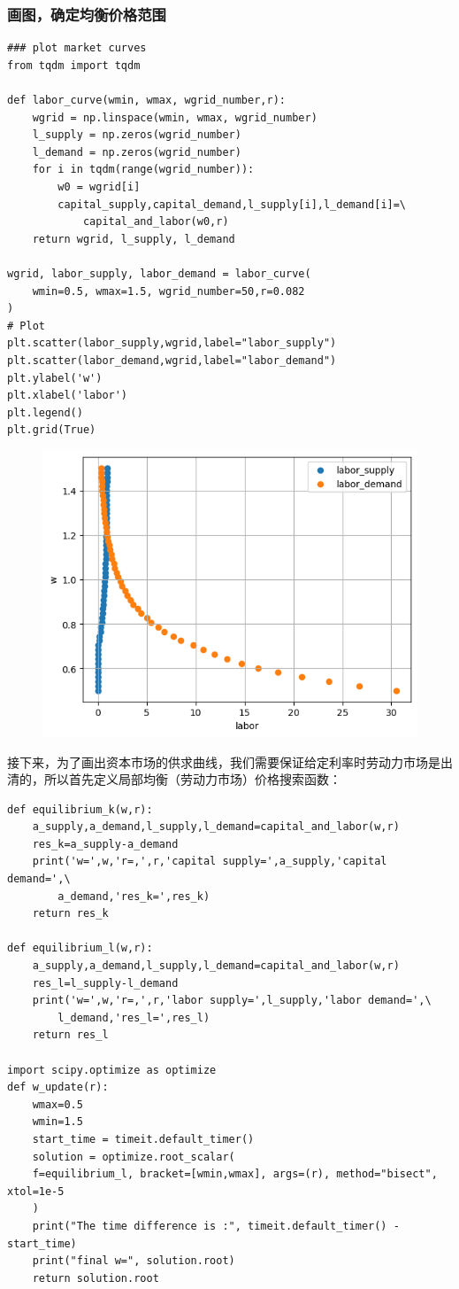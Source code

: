 \documentclass[a4paper, 12pt]{ctexart}
\begin{document}
\subsubsection{画图，确定均衡价格范围}
\begin{lstlisting}
### plot market curves
from tqdm import tqdm

def labor_curve(wmin, wmax, wgrid_number,r):
    wgrid = np.linspace(wmin, wmax, wgrid_number)
    l_supply = np.zeros(wgrid_number)
    l_demand = np.zeros(wgrid_number)
    for i in tqdm(range(wgrid_number)):
        w0 = wgrid[i]
        capital_supply,capital_demand,l_supply[i],l_demand[i]=\
            capital_and_labor(w0,r)
    return wgrid, l_supply, l_demand

wgrid, labor_supply, labor_demand = labor_curve(
    wmin=0.5, wmax=1.5, wgrid_number=50,r=0.082
)
# Plot
plt.scatter(labor_supply,wgrid,label="labor_supply")
plt.scatter(labor_demand,wgrid,label="labor_demand")
plt.ylabel('w')
plt.xlabel('labor')
plt.legend()
plt.grid(True)
\end{lstlisting}

\begin{figure}[h]
    \centering
    \includegraphics[width=0.8\linewidth]{pic/8.png}
    \nonumber
    \label{fig:enter-label}
\end{figure}

接下来，为了画出资本市场的供求曲线，我们需要保证给定利率时劳动力市场是出清的，所以首先定义局部均衡（劳动力市场）价格搜索函数：
\begin{lstlisting}
def equilibrium_k(w,r):
    a_supply,a_demand,l_supply,l_demand=capital_and_labor(w,r)
    res_k=a_supply-a_demand
    print('w=',w,'r=,',r,'capital supply=',a_supply,'capital demand=',\
        a_demand,'res_k=',res_k)
    return res_k
    
def equilibrium_l(w,r):
    a_supply,a_demand,l_supply,l_demand=capital_and_labor(w,r)
    res_l=l_supply-l_demand
    print('w=',w,'r=,',r,'labor supply=',l_supply,'labor demand=',\
        l_demand,'res_l=',res_l)
    return res_l

import scipy.optimize as optimize
def w_update(r):
    wmax=0.5
    wmin=1.5
    start_time = timeit.default_timer()
    solution = optimize.root_scalar(
    f=equilibrium_l, bracket=[wmin,wmax], args=(r), method="bisect", xtol=1e-5
    )
    print("The time difference is :", timeit.default_timer() - start_time)
    print("final w=", solution.root)
    return solution.root
\end{lstlisting}
\end{document}
